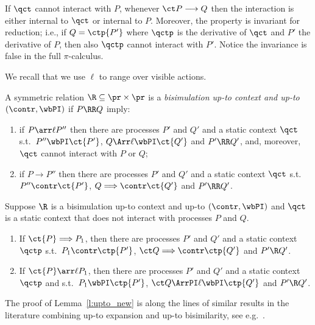 If  $\qct$ {cannot interact} with $P$,
whenever $\ct P \longrightarrow Q$ then  the
interaction is either internal to $\qct$ or internal to $P$. Moreover,
the property is invariant for reduction; i.e., 
if $Q = \ctp{P'}$ where $\qctp$ is the derivative of $\qct$ and $P'$
the derivative of $P$, then also 
$\qctp$  cannot interact with  $P'$.
Notice the invariance is false in the full $\pi$-calculus. 


We recall that we use $\ell$ to range over visible actions. 
\begin{definition}
\label{d:uptocontext_contr_wb}
A symmetric relation $  \R   \subseteq \pr \times \pr $ is a 
{\em bisimulation up-to context and up-to $(\contr,\wbPI)$}
if $P \RR Q$ imply:
  \begin{enumerate}
  \item if $P \arr\ell P''$
  then there are processes $P'$ and $Q'$ 
  and a static context $\qct$  
  s.t.\  $P'' \wbPI \ct {P'}$, $Q \Arr\ell  \wbPI  \ct{Q'}$ 
  and $P' \RR Q'$, 
  and, moreover, $\qct$ cannot interact with $P$ or $Q$; 
  \item if $P \longrightarrow P''$
  then there are processes $P'$ and $Q'$
  and a static context $\qct$
  s.t.\  $ P'' \contr \ct {P'}$, 
  $Q \Longrightarrow \contr  \ct{Q'}$ 
  and $P' \RR Q'$.
  \end{enumerate}
\end{definition}


\begin{lemma}
  \label{l:upto_new}
  Suppose $ \R  $  is a 
  bisimulation up-to context and up-to $(\contr,\wbPI)$ 
  and $\qct$ is a static context 
  that does not interact with processes $P$ and $Q$.  
  \begin{enumerate}
  \item  
  If  $\ct{P}\Longrightarrow   P_1$, 
  then there are processes $P'$ and $Q'$ 
  and a static context $\qctp$
  s.t.\  
  $P_1 \contr \ctp{P'}$, 
  $\ct Q \Longrightarrow \contr \ctp{Q'}$ 
  and $P'  \R  Q'$. 
  
  \item 
  If $\ct{P}\arr\ell   P_1$, 
  then there are processes $P'$ and $Q'$ and 
  a static context $\qctp$ and 
  s.t.\  
  $P_1 \wbPI \ctp{P'}$, 
  $\ct Q \ArrPI\ell \wbPI \ctp{Q'}$ 
  and $P'  \R  Q'$. 
  \end{enumerate} 
\end{lemma}

\noindent
The proof of  Lemma~\ref{l:upto_new} is along the lines of similar results in the
literature combining up-to expansion and up-to bisimilarity, see e.g.~\cite{SaWabook}. 

